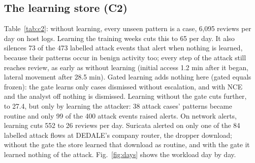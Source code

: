 \documentclass[conference]{IEEEtran}
\begin{document}
\begin{table}[t]
\caption{The same recorded answers without and with asymmetric trust.}\label{tab:asym}
\centering\small
{}
\end{table}

\subsection{The learning store (C2)}
Table~\ref{tab:c2}: without learning, every unseen pattern is a case, 6,095 reviews per day on host logs. Learning
the training weeks cuts this to 65 per day. It also silences 73 of the 473 labelled attack events that alert when
nothing is learned, because their patterns occur in benign activity too; every step of the attack still reaches
review, as early as without learning (initial access 1.2 min after it began, lateral movement after 28.5 min).
Gated learning adds nothing here (gated equals frozen): the gate learns only cases dismissed without escalation,
and with NCE and the analyst off nothing is dismissed. Learning without the gate cuts further, to 27.4, but only
by learning the attacker: 38 attack cases' patterns became routine and only 99 of the 400 attack events raised
alerts. On network alerts, learning cuts 552 to 26 reviews per day. Suricata alerted on only one of the 84
labelled attack flows at DEDALE's company router, the dropper download; without the gate the store learned that
download as routine, and with the gate it learned nothing of the attack. Fig.~\ref{fig:days} shows the workload
day by day.
\end{document}
